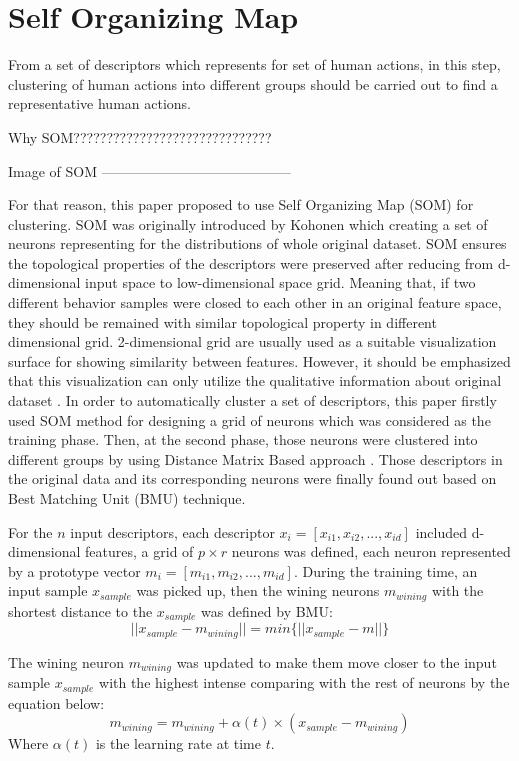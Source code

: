 \section{Self Organizing Map}
From a set of descriptors which represents for set of human actions, in this step, clustering of human actions into different groups should be carried out to find a representative human actions. 

Why SOM??????????????????????????????

Image of SOM -----------------------------------------

For that reason, this paper proposed to use Self Organizing Map (SOM) for clustering. SOM was originally introduced by Kohonen \cite{kohonen1990self} which creating a set of neurons representing for the distributions of whole original dataset. SOM ensures the topological properties of the descriptors were preserved after reducing from d-dimensional input space to low-dimensional space grid. Meaning that, if two different behavior samples were closed to each other in an original feature space, they should be remained with similar topological property in different dimensional grid. 2-dimensional grid are usually used as a suitable visualization surface for showing similarity between features. However, it should be emphasized that this visualization can only utilize the qualitative information about original dataset \cite{vesanto2000clustering}. In order to automatically cluster a set of descriptors, this paper firstly used SOM method for designing a grid of neurons which was considered as the training phase. Then, at the second phase, those neurons were clustered into different groups by using Distance Matrix Based approach \cite{vesanto2002distance}. Those descriptors in the original data and its corresponding neurons were finally found out based on Best Matching Unit (BMU) technique.

For the $n$ input descriptors, each descriptor $x_i=[x_{i1},x_{i2},...,x_{id}]$ included d-dimensional features, a grid of $p \times r$ neurons was defined, each neuron represented by a prototype vector $m_i=[m_{i1},m_{i2},...,m_{id}]$. During the training time, an input sample $x_{sample}$ was picked up, then the wining neurons $m_{wining}$ with the shortest distance to the $x_{sample}$ was defined by BMU:
\begin{equation}
||x_{sample} - m_{wining}|| = min\{||x_{sample}-m||\}
\label{eq:BMU}
\end{equation}

The wining neuron $m_{wining}$ was updated to make them move closer to the input sample $x_{sample}$ with the highest intense comparing with the rest of neurons by the equation below:
\begin{equation}
m_{wining} = m_{wining} + \alpha(t) \times (x_{sample}-m_{wining}) 
\end{equation}
Where $\alpha(t)$ is the learning rate at time $t$.

